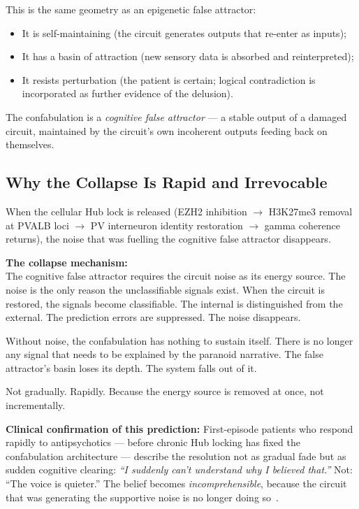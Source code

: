 \documentclass[12pt,a4paper]{article}
\newenvironment{derivenv}{%
  \begin{tcolorbox}[colback=lightgray,colframe=midgray,boxrule=0.5pt,
    arc=3pt,left=8pt,right=8pt,top=6pt,bottom=6pt,breakable]}{%
  \end{tcolorbox}}
\begin{document}
This is the same geometry as an epigenetic false attractor:
\begin{itemize}
  \item It is self-maintaining (the circuit generates outputs
    that re-enter as inputs);
  \item It has a basin of attraction (new sensory data is
    absorbed and reinterpreted);
  \item It resists perturbation (the patient is certain;
    logical contradiction is incorporated as further evidence
    of the delusion).
\end{itemize}

The confabulation is a \emph{cognitive false attractor} --- a
stable output of a damaged circuit, maintained by the circuit's
own incoherent outputs feeding back on themselves.

\subsection{Why the Collapse Is Rapid and Irrevocable}

When the cellular Hub lock is released (EZH2 inhibition
$\to$ H3K27me3 removal at PVALB loci $\to$ PV interneuron
identity restoration $\to$ gamma coherence returns), the
noise that was fuelling the cognitive false attractor
disappears.

\begin{derivenv}
\textbf{The collapse mechanism:}\\[4pt]
The cognitive false attractor requires the circuit noise as
its energy source. The noise is the only reason the
unclassifiable signals exist. When the circuit is restored,
the signals become classifiable. The internal is
distinguished from the external. The prediction errors
are suppressed. The noise disappears.

Without noise, the confabulation has nothing to sustain
itself. There is no longer any signal that needs to be
explained by the paranoid narrative. The false attractor's
basin loses its depth. The system falls out of it.

Not gradually. Rapidly. Because the energy source is removed
at once, not incrementally.
\end{derivenv}

\noindent\textbf{Clinical confirmation of this prediction:}
First-episode patients who respond rapidly to antipsychotics
--- before chronic Hub locking has fixed the confabulation
architecture --- describe the resolution not as gradual
fade but as sudden cognitive clearing:
\textit{``I suddenly can't understand why I believed that.''}
Not: ``The voice is quieter.'' The belief becomes
\emph{incomprehensible}, because the circuit that was
generating the supportive noise is no longer doing so~\cite{Kapur2003}.
\end{document}

